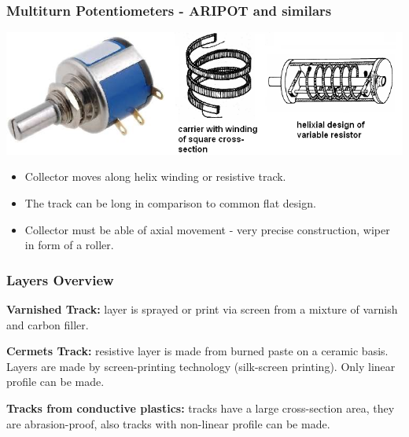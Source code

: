 \documentclass{beamer}
\begin{document}
	\begin{frame}
    \frametitle{Multiturn Potentiometers - ARIPOT and similars}
		\begin{center}
		\includegraphics[scale=0.4]{obr06_viceotackovy.png}
		\end{center}
		\begin{itemize}
			\item Collector moves along helix winding or resistive track.
			\item The track can be long in comparison to common flat design.
			\item Collector must be able of axial movement - very precise construction, wiper in form of a roller.
		\end{itemize}
  \end{frame}
	\begin{frame}
    \frametitle{Layers Overview}
		\begin{flushleft}
		\textbf{Varnished Track:} layer is sprayed or print via screen from a mixture of varnish and carbon filler.
		\end{flushleft}
		\begin{flushleft}
		\textbf{Cermets Track:} resistive layer is made from burned paste on a ceramic basis. Layers are made by screen-printing technology (silk-screen printing). Only linear profile can be made.
		\end{flushleft}
		\begin{flushleft}
		\textbf{Tracks from conductive plastics:} tracks have a large cross-section area, they are abrasion-proof, also tracks with non-linear profile can be made.
		\end{flushleft}
  \end{frame}
\end{document}
